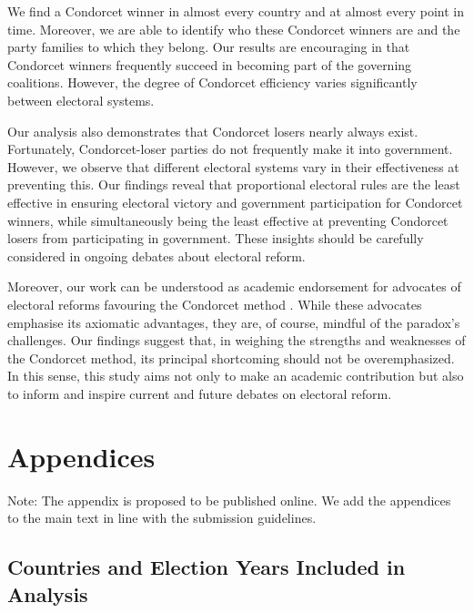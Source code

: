 \documentclass[12pt]{scrartcl}
\begin{document}
We find a Condorcet winner in almost every country and at almost every point in time. Moreover, we are able to identify who these Condorcet winners are and the party families to which they belong. Our results are encouraging in that Condorcet winners frequently succeed in becoming part of the governing coalitions. However, the degree of Condorcet efficiency varies significantly between electoral systems.

Our analysis also demonstrates that Condorcet losers nearly always exist. Fortunately, Condorcet-loser parties do not frequently make it into government. However, we observe that different electoral systems vary in their effectiveness at preventing this. Our findings reveal that proportional electoral rules are the least effective in ensuring electoral victory and government participation for Condorcet winners, while simultaneously being the least effective at preventing Condorcet losers from participating in government. These insights should be carefully considered in ongoing debates about electoral reform.

Moreover, our work can be understood as academic endorsement for advocates of electoral reforms favouring the Condorcet method \citep{Maskin2016, Maskin2017, Maskin2017a}. While these advocates emphasise its axiomatic advantages, they are, of course, mindful of the paradox's challenges. Our findings suggest that, in weighing the strengths and weaknesses of the Condorcet method, its principal shortcoming should not be overemphasized. In this sense, this study aims not only to make an academic contribution but also to inform and inspire current and future debates on electoral reform.

\newpage 
\singlespacing
%


%

\appendix
\section*{Appendices}

Note: The appendix is  proposed to be published online. We add the appendices to the main text in line with the submission guidelines. 

\singlespacing
\newpage
\begin{landscape}
\section{Countries and Election Years Included in Analysis}

\end{landscape}
	
\end{document}
